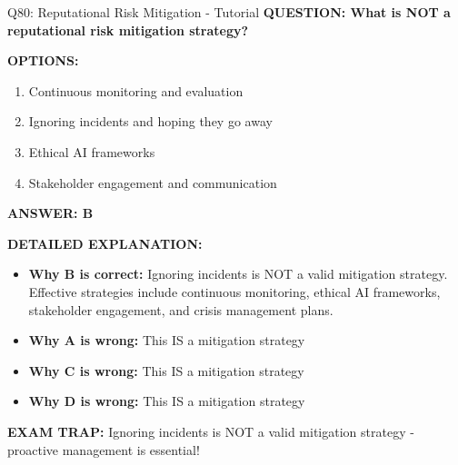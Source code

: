 \documentclass[8pt]{beamer}
\begin{document}
	\begin{frame}{Q80: Reputational Risk Mitigation - Tutorial}
		\fontsize{6.5}{7.5}\selectfont
		\textbf{QUESTION: What is NOT a reputational risk mitigation strategy?}
		
		\vspace{0.1cm}
		\textbf{OPTIONS:}
		\begin{enumerate}
			\item Continuous monitoring and evaluation
			\item Ignoring incidents and hoping they go away
			\item Ethical AI frameworks
			\item Stakeholder engagement and communication
		\end{enumerate}
		
		\vspace{0.1cm}
		\textcolor{myblue}{\textbf{ANSWER: B}}
		
		\vspace{0.1cm}
		\textbf{DETAILED EXPLANATION:}
		\begin{itemize}
			\item \textbf{Why B is correct:} Ignoring incidents is NOT a valid mitigation strategy. Effective strategies include continuous monitoring, ethical AI frameworks, stakeholder engagement, and crisis management plans.
			\item \textbf{Why A is wrong:} This IS a mitigation strategy
			\item \textbf{Why C is wrong:} This IS a mitigation strategy
			\item \textbf{Why D is wrong:} This IS a mitigation strategy
		\end{itemize}
		
		\textcolor{myred}{\textbf{EXAM TRAP:}} Ignoring incidents is \textcolor{myblue}{NOT a valid mitigation strategy} - proactive management is essential!
	\end{frame}
	
	
\end{document}
